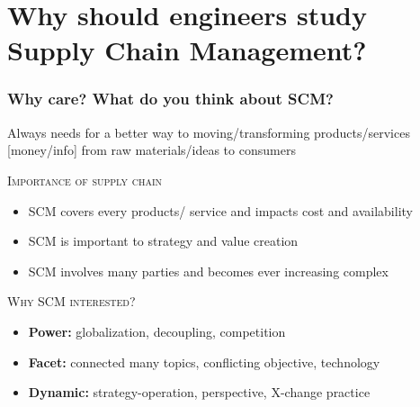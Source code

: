 \documentclass[10pt,handout]{beamer}
\begin{document}
\section[SCM \& me]{Why should engineers study Supply Chain Management?}
\begin{frame}[label=why_care]
  \frametitle{Why care? What do you think about SCM? }

  \begin{alertblock}{}{}
     Always needs for a better way to \alert{moving/transforming} products/services [money/info] from raw materials/ideas to consumers \hfill \hyperlink{trade}{}
  \end{alertblock}

  \NextLine
  \textsc{Importance of supply chain}
  \begin{itemize}
    \item SCM covers every \alert{products/ service} and impacts \alert{cost} and \alert{availability}
    \item SCM is important to \alert{strategy} and \alert{value creation}
    \item SCM involves \alert{many parties} and becomes ever increasing \alert{complex}
  \end{itemize}

  \NextLine
  \textsc{Why SCM interested?}
  \begin{itemize}
    \item<2-> \textbf{Power:} globalization, decoupling, \alert{competition} \hfill \hyperlink{stat}{}
    \item<2-> \textbf{Facet:} connected many topics, conflicting objective, \alert{technology} \hfill  \hyperlink{multiDis}{}
    \item<2-> \textbf{Dynamic:} strategy-operation, perspective, X-change practice       \hfill  \hyperlink{dynamics}{}
  \end{itemize}


\end{frame}
\end{document}
